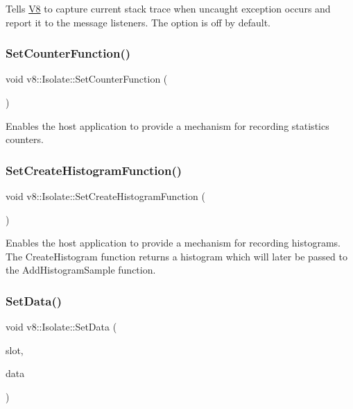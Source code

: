 Tells \mbox{\hyperlink{classv8_1_1V8}{V8}} to capture current stack trace when uncaught exception occurs and report it to the message listeners. The option is off by default. \mbox{\label{classv8_1_1Isolate_ab59a904591d417ebb3889b5fa507447b}} 
\subsubsection{\texorpdfstring{Set\+Counter\+Function()}{SetCounterFunction()}}
{\footnotesize\ttfamily void v8\+::\+Isolate\+::\+Set\+Counter\+Function (\begin{DoxyParamCaption}\item[{Counter\+Lookup\+Callback}]{ }\end{DoxyParamCaption})}

Enables the host application to provide a mechanism for recording statistics counters. \mbox{\label{classv8_1_1Isolate_afd624c7e429a061c1cd9e5959ce6ebf0}} 
\subsubsection{\texorpdfstring{Set\+Create\+Histogram\+Function()}{SetCreateHistogramFunction()}}
{\footnotesize\ttfamily void v8\+::\+Isolate\+::\+Set\+Create\+Histogram\+Function (\begin{DoxyParamCaption}\item[{Create\+Histogram\+Callback}]{ }\end{DoxyParamCaption})}

Enables the host application to provide a mechanism for recording histograms. The Create\+Histogram function returns a histogram which will later be passed to the Add\+Histogram\+Sample function. \mbox{\label{classv8_1_1Isolate_a2ae968a7ff8a397f1ac09d32990883f6}} 
\subsubsection{\texorpdfstring{Set\+Data()}{SetData()}}
{\footnotesize\ttfamily void v8\+::\+Isolate\+::\+Set\+Data (\begin{DoxyParamCaption}\item[{uint32\+\_\+t}]{slot,  }\item[{void $\ast$}]{data }\end{DoxyParamCaption})}

